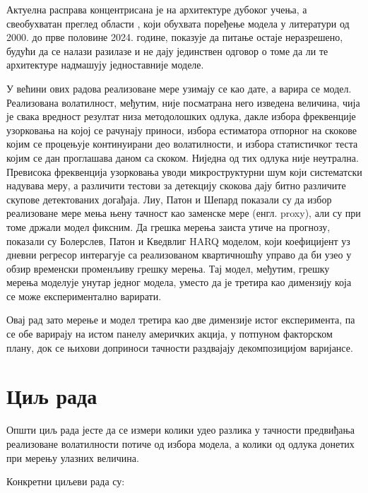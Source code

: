 Актуелна расправа концентрисана је на архитектуре дубоког учења, а свеобухватан преглед
области \parencite{leushuisPetkov2026}, који обухвата поређење модела у литератури од
2000. до прве половине 2024. године, показује да питање остаје неразрешено, будући да се
налази разилазе и не дају јединствен одговор о томе да ли те архитектуре надмашују
једноставније моделе.

У већини ових радова реализоване мере узимају се као дате, а варира се модел.
Реализована волатилност, међутим, није посматрана него изведена величина, чија је свака
вредност резултат низа методолошких одлука, дакле избора
фреквенције узорковања на којој се рачунају приноси, избора естиматора отпорног на
скокове којим се процењује континуирани део волатилности, и избора статистичког теста
којим се дан проглашава даном са скоком. Ниједна од тих одлука није неутрална. Превисока
фреквенција узорковања уводи микроструктурни шум који систематски надувава меру, а
различити тестови за детекцију скокова дају битно различите скупове детектованих
догађаја. Лиу, Патон и Шепард \parencite{lps2015} показали су да избор реализоване
мере мења њену тачност као заменске мере (енгл. proxy), али су при томе држали модел
фиксним. Да грешка
мерења заиста утиче на прогнозу, показали су Болерслев, Патон и Кведвлиг
\parencite{bpq2016} HARQ моделом, који коефицијент уз дневни регресор интерагује са
реализованом квартичношћу управо да би узео у обзир временски променљиву грешку
мерења. Тај модел, међутим, грешку мерења моделује унутар једног модела, уместо да је
третира као димензију која се може експериментално варирати.

Овај рад зато мерење и модел третира као две димензије истог експеримента, па се обе
варирају на истом панелу америчких акција, у потпуном факторском плану, док се њихови
доприноси тачности раздвајају декомпозицијом варијансе.

\section{Циљ рада}

Општи циљ рада јесте да се измери колики удео разлика у тачности предвиђања реализоване
волатилности потиче од избора модела, а колики од одлука донетих при мерењу улазних
величина.

Конкретни циљеви рада су:

